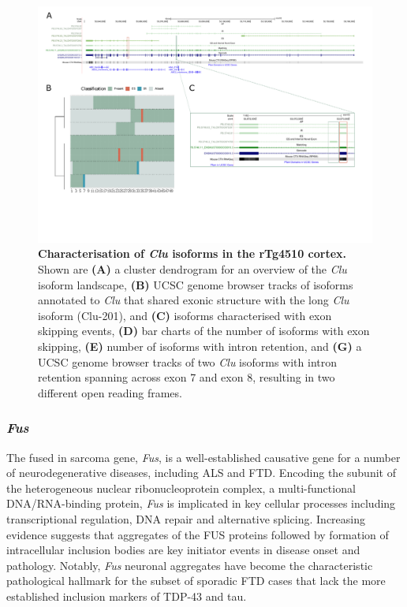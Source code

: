 \begin{landscape}
	\begin{figure}[htp]
		\centering
		\captionsetup{width=1.3\textwidth}
		\includegraphics[page=6,trim={0 1.5cm 0 0},scale = 0.85]{Figures/TargetGenes_Annotation_Landscape.pdf}
		\caption[Characterisation of the \textit{Clu} isoform landscape]%
		{\textbf{Characterisation of \textit{Clu} isoforms in the rTg4510 cortex.} Shown are \textbf{(A)} a cluster dendrogram for an overview of the \textit{Clu} isoform landscape, \textbf{(B)} UCSC genome browser tracks of isoforms annotated to \textit{Clu} that shared exonic structure with the long \textit{Clu} isoform (Clu-201), and \textbf{(C)} isoforms characterised with exon skipping events, \textbf{(D)} bar charts of the number of isoforms with exon skipping, \textbf{(E)} number of isoforms with intron retention, and \textbf{(G)} a UCSC genome browser tracks of two \textit{Clu} isoforms with intron retention spanning across exon 7 and exon 8, resulting in two different open reading frames.}    
		\label{fig:clu}
	\end{figure}
\end{landscape}
\restoregeometry



\newpage
\subsubsection{\textit{Fus}}
The fused in sarcoma gene, \textit{Fus}, is a well-established causative gene for a number of neurodegenerative diseases, including ALS and FTD. Encoding the subunit of the heterogeneous nuclear ribonucleoprotein complex, a multi-functional DNA/RNA-binding protein,  \textit{Fus} is implicated in key cellular processes including transcriptional regulation, DNA repair and alternative splicing\cite{Shelkovnikova2014}. Increasing evidence suggests that aggregates of the FUS proteins followed by formation of intracellular inclusion bodies are key initiator events in disease onset and pathology\cite{Shelkovnikova2014}. Notably, \textit{Fus} neuronal aggregates have become the characteristic pathological hallmark for the subset of sporadic FTD cases that lack the more established inclusion markers of TDP-43 and tau\cite{Seelaar2010}.

